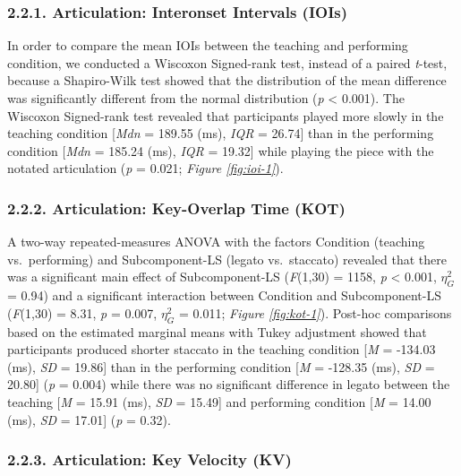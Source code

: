\documentclass[
  english,
  man,floatsintext]{apa6}
\begin{document}
\hypertarget{articulation-interonset-intervals-iois}{%
\subsubsection{2.2.1. Articulation: Interonset Intervals (IOIs)}\label{articulation-interonset-intervals-iois}}

In order to compare the mean IOIs between the teaching and performing condition, we conducted a Wiscoxon Signed-rank test, instead of a paired \emph{t}-test, because a Shapiro-Wilk test showed that the distribution of the mean difference was significantly different from the normal distribution (\emph{p} \textless{} 0.001). The Wiscoxon Signed-rank test revealed that participants played more slowly in the teaching condition {[}\emph{Mdn} = 189.55 (ms), \emph{IQR} = 26.74{]} than in the performing condition {[}\emph{Mdn} = 185.24 (ms), \emph{IQR} = 19.32{]} while playing the piece with the notated articulation (\emph{p} = 0.021; \emph{Figure \ref{fig:ioi-1}}).

\hypertarget{articulation-key-overlap-time-kot}{%
\subsubsection{2.2.2. Articulation: Key-Overlap Time (KOT)}\label{articulation-key-overlap-time-kot}}

A two-way repeated-measures ANOVA with the factors Condition (teaching vs.~performing) and Subcomponent-LS (legato vs.~staccato) revealed that there was a significant main effect of Subcomponent-LS (\emph{F}(1,30) = 1158, \emph{p} \textless{} 0.001, \(\eta_G^2\) = 0.94) and a significant interaction between Condition and Subcomponent-LS (\emph{F}(1,30) = 8.31, \emph{p} = 0.007, \(\eta_G^2\) = 0.011; \emph{Figure \ref{fig:kot-1}}). Post-hoc comparisons based on the estimated marginal means with Tukey adjustment showed that participants produced shorter staccato in the teaching condition {[}\emph{M} = -134.03 (ms), \emph{SD} = 19.86{]} than in the performing condition {[}\emph{M} = -128.35 (ms), \emph{SD} = 20.80{]} (\emph{p} = 0.004) while there was no significant difference in legato between the teaching {[}\emph{M} = 15.91 (ms), \emph{SD} = 15.49{]} and performing condition {[}\emph{M} = 14.00 (ms), \emph{SD} = 17.01{]} (\emph{p} = 0.32).

\hypertarget{articulation-key-velocity-kv}{%
\subsubsection{2.2.3. Articulation: Key Velocity (KV)}\label{articulation-key-velocity-kv}}
\end{document}
